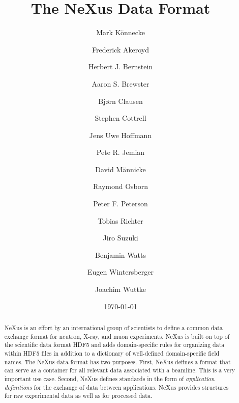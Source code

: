 \documentclass[%
 aip,
rsi,
 amsmath,amssymb,
 reprint,%
]{revtex4-1}
\begin{document}

\title{The NeXus Data Format}


\author{Mark K\"onnecke}

\author{Frederick Akeroyd}

\author{Herbert J. Bernstein}

\author{Aaron S. Brewster}

\author{Bj{\o}rn Clausen}

\author{Stephen Cottrell}

\author{Jens Uwe Hoffmann}

\author{Pete R. Jemian}

\author{David M\"annicke}

\author{Raymond Osborn}

\author{Peter F. Peterson}

\author{Tobias Richter}

\author{Jiro Suzuki}

\author{Benjamin Watts}

\author{Eugen Wintersberger}

\author{Joachim Wuttke}



\date{\today}%

\begin{abstract}
NeXus is an effort by an international group of scientists to define 
 a common data exchange format for neutron, X-ray, and muon experiments.   
NeXus is built on top of the scientific data format HDF5 and adds 
domain-specific 
rules for organizing data within HDF5 files in addition to a dictionary of well-defined 
domain-specific field names. The NeXus data format has two purposes.  First, NeXus defines a
format that can serve as a container for all relevant data associated
with a beamline. This is a very important use case.  Second, NeXus
defines standards in the form of \emph{application definitions} for the
exchange of data between applications.  NeXus provides structures for raw experimental data as well as for processed data.  
\end{abstract}
\end{document}
